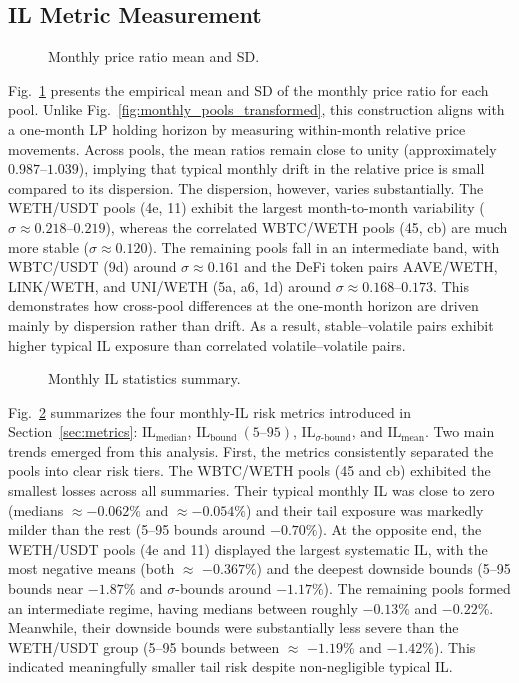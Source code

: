 \documentclass[journal]{IEEEtran}
\begin{document}
\subsection{IL Metric Measurement}

\begin{figure}[b]
    \centering
    \resizebox{0.5\textwidth}{!}{%
        
    }
    \caption{Monthly price ratio mean and SD.}
    \label{fig:mean_std_R}
\end{figure}

Fig.~\ref{fig:mean_std_R} presents the empirical mean and SD of the monthly price ratio for each pool.
Unlike Fig.~\ref{fig:monthly_pools_transformed}, this construction aligns with a one-month LP holding horizon by measuring within-month relative price movements.
Across pools, the mean ratios remain close to unity (approximately \(0.987\)–\(1.039\)), implying that typical monthly drift in the relative price is small compared to its dispersion.
The dispersion, however, varies substantially. The WETH/USDT pools (4e, 11) exhibit the largest month-to-month variability
(\(\sigma \approx 0.218\)–\(0.219\)), whereas the correlated WBTC/WETH pools (45, cb) are much more stable
(\(\sigma \approx 0.120\)).
The remaining pools fall in an intermediate band, with WBTC/USDT (9d) around \(\sigma \approx 0.161\) and the DeFi token pairs AAVE/WETH, LINK/WETH, and UNI/WETH (5a, a6, 1d) around \(\sigma \approx 0.168\)–\(0.173\).
This demonstrates how cross-pool differences at the one-month horizon are driven mainly by dispersion rather than drift. 
As a result, stable--volatile pairs exhibit higher typical IL exposure than correlated volatile--volatile pairs.



\begin{figure}[t]
\centering
\resizebox{0.5\textwidth}{!}{%
        
    }
\caption{Monthly IL statistics summary. }
\label{fig:monthly_il_summary_metrics}
\end{figure}

Fig.~\ref{fig:monthly_il_summary_metrics} summarizes the four monthly-IL risk metrics introduced in Section~\ref{sec:metrics}: $\mathrm{IL}_{\text{median}}$, $\mathrm{IL}_{\text{bound}}~(5\text{--}95)$, $\mathrm{IL}_{\sigma\text{-bound}}$, and $\mathrm{IL}_{\text{mean}}$. Two main trends emerged from this analysis. 
First, the metrics consistently separated the pools into clear risk tiers. The WBTC/WETH pools (45 and cb) exhibited the smallest losses across all summaries. Their typical monthly IL was close to zero (medians $\approx-0.062\%$ and $\approx-0.054\%$) and their tail exposure was markedly milder than the rest (5--95 bounds around $-0.70\%$). At the opposite end, the WETH/USDT pools (4e and 11) displayed the largest systematic IL, with the most negative means (both $\approx$ $-0.367\%$) and the deepest downside bounds (5--95 bounds near $-1.87\%$ and $\sigma$-bounds around $-1.17\%$). 
The remaining pools formed an intermediate regime, having medians between roughly $-0.13\%$ and $-0.22\%$. Meanwhile, their downside bounds were substantially less severe than the WETH/USDT group (5--95 bounds between $\approx$ $-1.19\%$ and $-1.42\%$). This indicated meaningfully smaller tail risk despite non-negligible typical IL.
\end{document}
